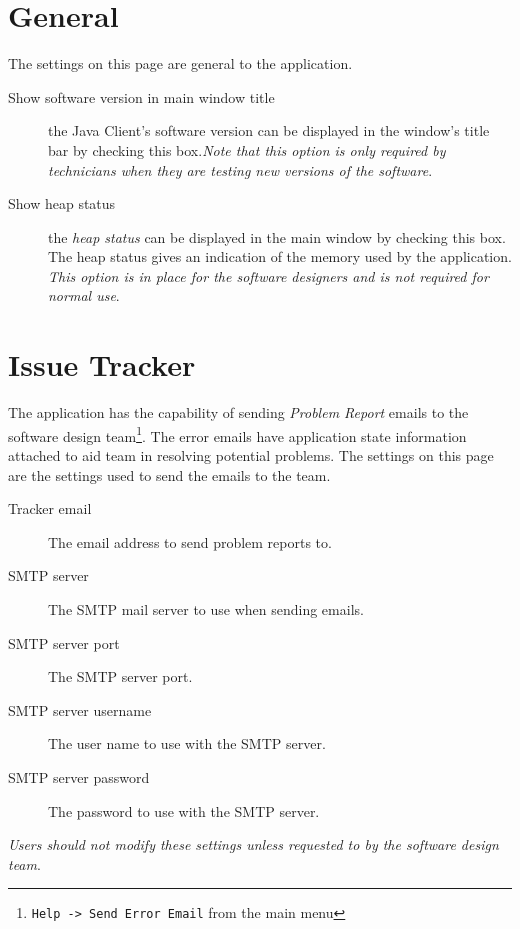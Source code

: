 \section{General}
The settings on this page are general to the application.
\begin{description}
  \item[Show software version in main window title] the Java Client's software
    version can be displayed in the window's title bar by checking this
    box.\textit{Note that this option is only required by technicians when they
      are testing new versions of the software}.
  \item[Show heap status] the \emph{heap status} can be displayed in the main
    window by checking this box. The heap status gives an indication of the
    memory used by the application. \textit{This option is in place for the
      software designers and is not required for normal use}.
\end{description}

\section{Issue Tracker}
The application has the capability of sending \emph{Problem Report} emails to
the software design team\footnote{\texttt{Help -> Send Error Email} from the
  main menu}. The error emails have application state information attached to
aid team in resolving potential problems. The settings on this page are the
settings used to send the emails to the team.

\begin{description}
  \item[Tracker email] The email address to send problem reports to.
  \item[SMTP server] The SMTP mail server to use when sending emails.
  \item[SMTP server port] The SMTP server port.
  \item[SMTP server username] The user name to use with the SMTP server.
  \item[SMTP server password] The password to use with the SMTP server.
\end{description}
\textit{Users should not modify these settings unless requested to by the software
  design team}.


